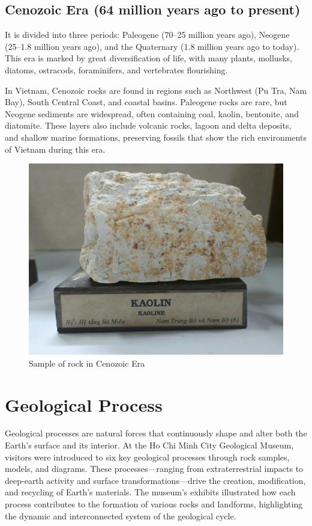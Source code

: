 \subsection{Cenozoic Era (64 million years ago to present)}
\label{subsec:cenozoic}

It is divided into three periods: Paleogene (70–25 million years ago), Neogene (25–1.8 million years ago), and the Quaternary (1.8 million years ago to today). This era is marked by great diversification of life, with many plants, mollusks, diatoms, ostracods, foraminifers, and vertebrates flourishing.

In Vietnam, Cenozoic rocks are found in regions such as Northwest (Pu Tra, Nam Bay), South Central Coast, and coastal basins. Paleogene rocks are rare, but Neogene sediments are widespread, often containing coal, kaolin, bentonite, and diatomite. These layers also include volcanic rocks, lagoon and delta deposits, and shallow marine formations, preserving fossils that show the rich environments of Vietnam during this era.

\begin{figure}[H]
  \centering
  \includegraphics[max width=0.8\linewidth]{graphics/figure_06.jpg}
  \caption{Sample of rock in Cenozoic Era}
  \label{fig:cenozoic-rock}
\end{figure}

\section{Geological Process}
\label{sec:geological-process}

Geological processes are natural forces that continuously shape and alter both the Earth's surface and its interior. At the Ho Chi Minh City Geological Museum, visitors were introduced to six key geological processes through rock samples, models, and diagrams. These processes—ranging from extraterrestrial impacts to deep-earth activity and surface transformations—drive the creation, modification, and recycling of Earth's materials. The museum's exhibits illustrated how each process contributes to the formation of various rocks and landforms, highlighting the dynamic and interconnected system of the geological cycle.

